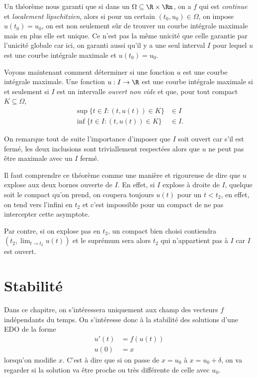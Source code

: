 Un théorème nous garanti que si dans
un $\Omega \subseteq \R\times\Rn$, on a $f$ qui est \emph{continue}
et \emph{localement lipschitzien},
alors si pour un certain $(t_0, u_0) \in \Omega$, on impose
$u(t_0) = u_0$, on est non seulement sûr de trouver un courbe intégrale
maximale mais en plus elle est unique.
Ce n'est pas la même unicité que celle garantie par l'unicité globale car
ici, on garanti aussi qu'il y a une seul interval $I$ pour lequel $u$
est une courbe intégrale maximale et $u(t_0) = u_0$.

Voyons maintenant comment déterminer si une fonction $u$ est une
courbe intégrale maximale.
Une fonction $u:I\to\R$ est une courbe intégrale maximale
si et seulement si
$I$ est un intervalle \emph{ouvert non vide} et que,
pour tout compact $K \subseteq \Omega$,
\begin{align*}
  \sup\{t \in I: (t, u(t)) \in K\} & \in I\\
  \inf\{t \in I: (t, u(t)) \in K\} & \in I.
\end{align*}

On remarque tout de suite l'importance d'imposer que $I$ soit ouvert
car s'il est fermé, les deux inclusions sont triviallement respectées
alors que $u$ ne peut pas être maximale avec un $I$ fermé.

Il faut comprendre ce théorème comme une manière et rigoureuse de dire que
$u$ explose aux deux bornes ouverte de $I$.
En effet, si $I$ explose à droite de $I$,
quelque soit le compact qu'on prend, on coupera toujours $u(t)$ pour un
$t < t_2$, en effet, on tend vers l'infini en $t_2$ et c'est impossible
pour un compact de ne pas intercepter cette asymptote.

Par contre, si on explose pas en $t_2$, un compact bien choisi
contiendra $(t_2, \lim_{t \to t_2} u(t))$ et le suprémum sera alors $t_2$
qui n'appartient pas à $I$ car $I$ est ouvert.

\section{Stabilité}
Dans ce chapitre, on s'intéressera uniquement aux
champ des vecteurs $f$ indépendants du temps.
On s'intéresse donc à la stabilité des solutions d'une EDO de la forme
\begin{align*}
  u'(t) & = f(u(t))\\
  u(0) & = x
\end{align*}
lorsqu'on modifie $x$.
C'est à dire que si on passe de $x = u_0$ à $x = u_0 + \delta$,
on va regarder si
la solution va être proche ou très différente de celle avec $u_0$.

